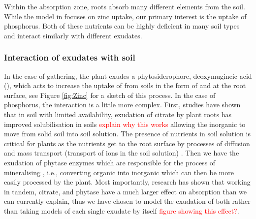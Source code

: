 \documentclass[11pt]{article}
\numberwithin{equation}{section}
\begin{document}
Within the absorption zone, roots absorb many different elements from the soil. While the model in \cite{Ptashnyk-2011} focuses on zinc uptake, our primary interest is the uptake of phosphorus. Both of these nutrients can be highly deficient in many soil types and interact similarly with different exudates.



\subsubsection{Interaction of exudates with soil}

In the case of   gathering, the plant exudes a phytosiderophore, deoxymugineic acid (), which acts to increase the uptake of  from soils in the form of  and  at the root surface, see Figure \ref{fig:Zinc} for a sketch of this process. In the case of phosphorus, the interaction is a little more complex. First, studies have shown that in soil with limited  availability, exudation of citrate by plant roots has improved  solubilisation in soils \textcolor{red}{explain why this works} allowing the inorganic  to move from solid soil into soil solution. The presence of nutrients in soil solution is critical for plants as the nutrients get to the root surface by processes of diffusion and mass transport (transport of ions in the soil solution) \cite{Reichardt2020}.
Then we have the exudation of phytase enzymes which are responsible for the process of mineralising , i.e., converting organic  into inorganic  which can then be more easily processed by the plant. Most importantly, research has shown that working in tandem, citrate, and phytase have a much larger effect on  absorption than we can currently explain, thus we have chosen to model the exudation of both rather than taking models of each single exudate by itself \cite{giles_george} \textcolor{red}{figure showing this effect?}.
\end{document}
